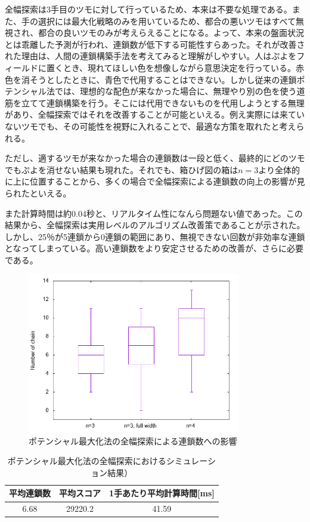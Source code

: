 \documentclass[12pt]{jreport}
\begin{document}
全幅探索は3手目のツモに対して行っているため、本来は不要な処理である。また、手の選択には最大化戦略のみを用いているため、都合の悪いツモはすべて無視され、都合の良いツモのみが考えらえることになる。よって、本来の盤面状況とは乖離した予測が行われ、連鎖数が低下する可能性すらあった。それが改善された理由は、人間の連鎖構築手法を考えてみると理解がしやすい。人はぷよをフィールドに置くとき、現れてほしい色を想像しながら意思決定を行っている。赤色を消そうとしたときに、青色で代用することはできない。しかし従来の連鎖ポテンシャル法では、理想的な配色が来なかった場合に、無理やり別の色を使う道筋を立てて連鎖構築を行う。そこには代用できないものを代用しようとする無理があり、全幅探索ではそれを改善することが可能といえる。例え実際には来ていないツモでも、その可能性を視野に入れることで、最適な方策を取れたと考えられる。

ただし、適するツモが来なかった場合の連鎖数は一段と低く、最終的にどのツモでもぷよを消せない結果も現れた。それでも、箱ひげ図の箱は$n=3$より全体的に上に位置することから、多くの場合で全幅探索による連鎖数の向上の影響が見られたといえる。

また計算時間は約0.04秒と、リアルタイム性になんら問題ない値であった。この結果から、全幅探索は実用レベルのアルゴリズム改善策であることが示された。しかし、25％が5連鎖から0連鎖の範囲にあり、無視できない回数が非効率な連鎖となってしまっている。高い連鎖数をより安定させるための改善が、さらに必要である。

\begin{figure}[tb]
  \begin{center}
  \includegraphics[height=7cm]{experiment/Potential/KAI/graph/chain_full.png}
  \caption{ポテンシャル最大化法の全幅探索による連鎖数への影響} \label{fig:poten_chain_width}
\end{center}
\end{figure}


\begin{table}[tb]
\begin{center}
\caption{ポテンシャル最大化法の全幅探索におけるシミュレーション結果）} \label{tab:poten_width}
\begin{tabular}{|c|c|c|} \hline
 平均連鎖数 & 平均スコア & 1手あたり平均計算時間[ms]\\ \hline
6.68 & 29220.2 & 41.59\\ \hline
\end{tabular}
\end{center}
\end{table}
\end{document}
